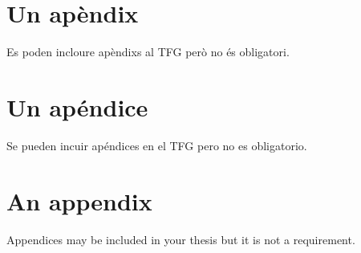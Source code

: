\ifcase\doclanguage\or
  \chapter{Un apèndix}
  Es poden incloure apèndixs al TFG però no és obligatori.
\or
  \chapter{Un apéndice}
  Se pueden incuir apéndices en el TFG pero no es obligatorio.
\else
  \chapter{An appendix}
  Appendices may be included in your thesis but it is not a requirement.
\fi
